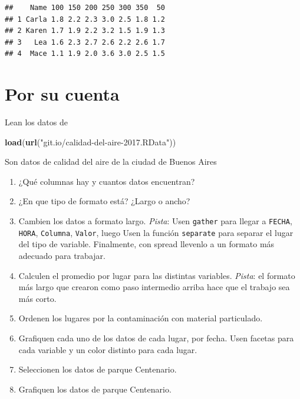 \documentclass[]{book}
\newenvironment{Shaded}{\begin{snugshade}}{\end{snugshade}}
\newcommand{\KeywordTok}[1]{\textcolor[rgb]{0.13,0.29,0.53}{\textbf{#1}}}
\newcommand{\NormalTok}[1]{#1}
\newcommand{\StringTok}[1]{\textcolor[rgb]{0.31,0.60,0.02}{#1}}
\providecommand{\tightlist}{%
  \setlength{\itemsep}{0pt}\setlength{\parskip}{0pt}}
\theoremstyle{definition}
\theoremstyle{definition}
\theoremstyle{definition}
\theoremstyle{remark}
\begin{document}
\begin{verbatim}
##    Name 100 150 200 250 300 350  50
## 1 Carla 1.8 2.2 2.3 3.0 2.5 1.8 1.2
## 2 Karen 1.7 1.9 2.2 3.2 1.5 1.9 1.3
## 3   Lea 1.6 2.3 2.7 2.6 2.2 2.6 1.7
## 4  Mace 1.1 1.9 2.0 3.6 3.0 2.5 1.5
\end{verbatim}

\hypertarget{por-su-cuenta}{%
\section{Por su cuenta}\label{por-su-cuenta}}

Lean los datos de

\begin{Shaded}
\begin{Highlighting}[]
\KeywordTok{load}\NormalTok{(}\KeywordTok{url}\NormalTok{(}\StringTok{"git.io/calidad-del-aire-2017.RData"}\NormalTok{))}
\end{Highlighting}
\end{Shaded}

Son datos de calidad del aire de la ciudad de Buenos Aires

\begin{enumerate}
\def\labelenumi{\arabic{enumi}.}
\tightlist
\item
  ¿Qué columnas hay y cuantos datos encuentran?
\item
  ¿En que tipo de formato está? ¿Largo o ancho?
\item
  Cambien los datos a formato largo. \emph{Pista}: Usen \texttt{gather}
  para llegar a \texttt{FECHA}, \texttt{HORA}, \texttt{Columna},
  \texttt{Valor}, luego Usen la función \texttt{separate} para separar
  el lugar del tipo de variable. Finalmente, con spread llevenlo a un
  formato más adecuado para trabajar.
\item
  Calculen el promedio por lugar para las distintas variables.
  \emph{Pista}: el formato más largo que crearon como paso intermedio
  arriba hace que el trabajo sea más corto.
\item
  Ordenen los lugares por la contaminación con material particulado.
\item
  Grafiquen cada uno de los datos de cada lugar, por fecha. Usen facetas
  para cada variable y un color distinto para cada lugar.
\item
  Seleccionen los datos de parque Centenario.
\item
  Grafiquen los datos de parque Centenario.
\end{enumerate}
\end{document}
